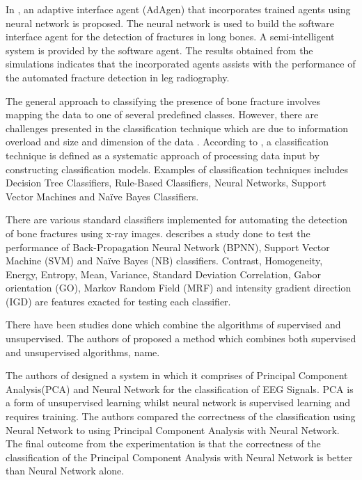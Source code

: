 \documentclass[11pt,twocolumn]{witseiepaper}
\begin{document}
	In \cite{Syiam_Aziem_Soliman2004}, an adaptive interface agent (AdAgen) that incorporates trained agents using neural network is proposed. The neural network is used to build the software interface agent for the detection of fractures in long bones. A semi-intelligent system is provided by the software agent. The results obtained from the simulations indicates that the incorporated agents assists with the performance of the automated fracture detection in leg radiography.
	
	The general approach to classifying the presence of bone fracture involves mapping the data to one of several predefined classes. However, there are challenges presented 
	in the classification technique which are due to information overload and size and dimension of the data \cite{Mahendran2011}. According to \cite{Mahendran2011}, a classification technique is defined as a systematic approach of processing data input by constructing classification models. Examples of classification techniques includes Decision Tree Classifiers, Rule-Based Classifiers, Neural Networks, Support Vector Machines and Na\"{i}ve Bayes Classifiers.
	
	There are various standard classifiers implemented for automating the detection of bone fractures using x-ray images. \cite{Mahendran2012} describes a study done to test the performance of Back-Propagation Neural Network (BPNN), Support Vector Machine (SVM) and Na\"{i}ve Bayes (NB) classifiers. Contrast, Homogeneity, Energy, Entropy, Mean, Variance, Standard Deviation Correlation, Gabor orientation (GO), Markov Random Field (MRF) and intensity gradient direction (IGD) are features exacted for testing each classifier.
	
	There have been studies done which combine the algorithms of supervised and unsupervised. The authors of \cite{neagoe_new_2014} proposed a method which combines both supervised and unsupervised algorithms, name.
	
	The authors of \cite{kottaimalai_eeg_2013} designed a system in which it comprises of Principal Component Analysis(PCA) and Neural Network for the classification of EEG Signals. PCA is a form of unsupervised learning whilst neural network is supervised learning and requires training. The authors compared the correctness of the classification using Neural Network to using Principal Component Analysis with Neural Network. The final outcome from the experimentation is that the correctness of the classification of the Principal Component Analysis with Neural Network is better than Neural Network alone. 
	
\end{document}
